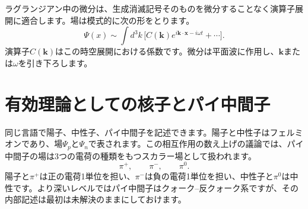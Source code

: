 \begin{classroomqa}
\end{classroomqa}

\begin{classroomqa}
\end{classroomqa}

ラグランジアン中の微分は、生成消滅記号そのものを微分することなく演算子展開に適合します。場は模式的に次の形をとります。
\begin{equation}
\Psi(x)
\sim
\int d^3k\,
\bigl[
C(\mathbf k)e^{i\mathbf k\cdot\mathbf x-i\omega t}
+\cdots
\bigr].
\end{equation}
演算子\(C(\mathbf k)\)はこの時空展開における係数です。微分は平面波に作用し、\(\mathbf k\)または\(\omega\)を引き下ろします。

\begin{classroomqa}
\end{classroomqa}

\section{有効理論としての核子とパイ中間子}

同じ言語で陽子、中性子、パイ中間子を記述できます。陽子と中性子はフェルミオンであり、場\(\Psi_p\)と\(\Psi_n\)で表されます。この相互作用の数え上げの議論では、パイ中間子の場は3つの電荷の種類をもつスカラー場として扱われます。
\begin{equation}
\pi^+,
\qquad
\pi^-,
\qquad
\pi^0.
\end{equation}
陽子と\(\pi^+\)は正の電荷1単位を担い、\(\pi^-\)は負の電荷1単位を担い、中性子と\(\pi^0\)は中性です。より深いレベルではパイ中間子はクォーク--反クォーク系ですが、その内部記述は最初は未解決のままにしておけます。

